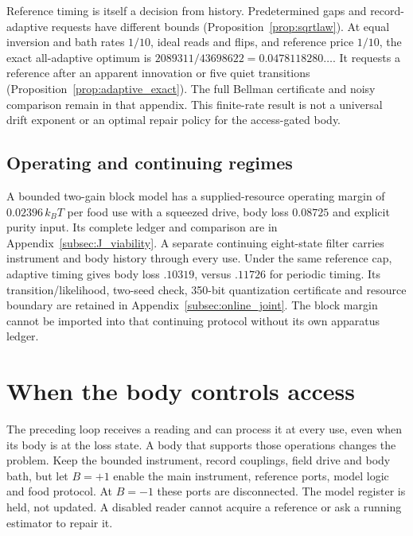 \documentclass[12pt]{article}
\theoremstyle{definition}
\begin{document}
Reference timing is itself a decision from history.
Predetermined gaps and record-adaptive requests have different bounds
(Proposition~\ref{prop:sqrtlaw}).
At equal inversion and bath rates $1/10$, ideal reads and flips, and
reference price $1/10$, the exact all-adaptive optimum is
$2089311/43698622=0.0478118280\ldots$.
It requests a reference after an apparent innovation or five quiet
transitions (Proposition~\ref{prop:adaptive_exact}).
The full Bellman certificate and noisy comparison remain in that
appendix. This finite-rate result is not a universal drift exponent
or an optimal repair policy for the access-gated body.

\subsection{Operating and continuing regimes}
A bounded two-gain block model has a supplied-resource operating margin
of $0.02396\,k_BT$ per food use with a squeezed drive, body loss
$0.08725$ and explicit purity input. Its complete ledger and comparison
are in Appendix~\ref{subsec:J_viability}.
A separate continuing eight-state filter carries instrument and body
history through every use. Under the same reference cap, adaptive
timing gives body loss $.10319$, versus $.11726$ for periodic timing.
Its transition/likelihood, two-seed check, 350-bit quantization certificate
and resource boundary are retained in Appendix~\ref{subsec:online_joint}.
The block margin cannot be imported into that continuing protocol
without its own apparatus ledger.

\section{When the body controls access}
\label{subsec:body_access}

The preceding loop receives a reading and can process it at every use, even when its body is at the loss state. A body that supports those operations changes the problem. Keep the bounded instrument, record couplings, field drive and body bath, but let $B=+1$ enable the main instrument, reference ports, model logic and food protocol. At $B=-1$ these ports are disconnected. The model register is held, not updated. A disabled reader cannot acquire a reference or ask a running estimator to repair it.
\end{document}
